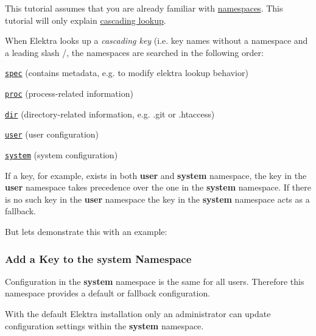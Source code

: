 This tutorial assumes that you are already familiar with \hyperlink{doc_tutorials_namespaces_md}{namespaces}. This tutorial will only explain \hyperlink{doc_help_elektra-cascading_md}{cascading lookup}.

When Elektra looks up a {\itshape cascading key} (i.\+e. key names without a namespace and a leading slash {\ttfamily /}, the namespaces are searched in the following order\+:


\begin{DoxyItemize}
\item \href{https://github.com/ElektraInitiative/libelektra/blob/master/doc/help/elektra-namespaces.md#spec}{\tt spec} (contains metadata, e.\+g. to modify elektra lookup behavior)
\item \href{https://github.com/ElektraInitiative/libelektra/blob/master/doc/help/elektra-namespaces.md#proc}{\tt proc} (process-\/related information)
\item \href{https://github.com/ElektraInitiative/libelektra/blob/master/doc/help/elektra-namespaces.md#dir}{\tt dir} (directory-\/related information, e.\+g. {\ttfamily .git} or {\ttfamily .htaccess})
\item \href{https://github.com/ElektraInitiative/libelektra/blob/master/doc/help/elektra-namespaces.md#user}{\tt user} (user configuration)
\item \href{https://github.com/ElektraInitiative/libelektra/blob/master/doc/help/elektra-namespaces.md#system}{\tt system} (system configuration)
\end{DoxyItemize}

If a key, for example, exists in both {\bfseries user} and {\bfseries system} namespace, the key in the {\bfseries user} namespace takes precedence over the one in the {\bfseries system} namespace. If there is no such key in the {\bfseries user} namespace the key in the {\bfseries system} namespace acts as a fallback.

But lets demonstrate this with an example\+:

\subsubsection*{Add a Key to the system Namespace}

Configuration in the {\bfseries system} namespace is the same for all users. Therefore this namespace provides a default or fallback configuration.

With the default Elektra installation only an administrator can update configuration settings within the {\bfseries system} namespace.


